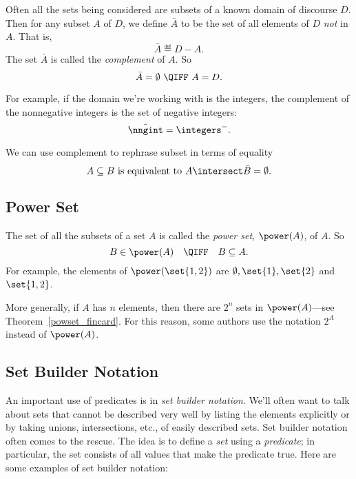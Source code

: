 Often all the sets being considered are subsets of a known domain
of discourse $D$.  Then for any subset $A$ of $D$, we define
$\bar{A}$ to be the set of all elements of $D$ \textit{not} in $A$.
That is,
\[
\bar{A} \eqdef D-A.
\]
The set $\bar{A}$ is called the \emph{complement}
  of $A$.  So
\[
\bar{A} = \emptyset\ \QIFF\ A = D.
\]

For example, if the domain we're working with is the integers, the
complement of the nonnegative integers is the set of negative integers:
\[
\bar{\nngint} = \integers^-.
\]

We can use complement to rephrase subset in terms of equality
\[
A \subseteq B \text{  is equivalent to  } A \intersect \bar{B} = \emptyset.
\]

\iffalse
It can be helpful to rephrase properties of sets using complements.  For
example, two sets $A$ and $B$ are said to be \term{disjoint} iff they
have no elements in common, that is, $A \intersect B = \emptyset$.  This
is the same as saying that $A$ is a subset of the complement of $B$, that
is, $A \subseteq \bar{B}$.
\fi

\subsection{Power Set}

The set of all the subsets of a set $A$ is called the \emph{power
  set},%
$\power(A)$, of $A$.  So
\[
B \in \power(A)\quad  \QIFF\quad  B \subseteq A.
\]
For example, the elements of $\power(\set{1, 2})$ are $\emptyset,
\set{1}, \set{2}$ and $\set{1, 2}$.

More generally, if $A$ has $n$ elements, then there are $2^n$ sets in
$\power(A)$---see Theorem~\ref{powset_fincard}.  For this reason,
some authors use the notation $2^A$ instead of $\power(A)$.

\subsection{Set Builder Notation}\label{set_builder_sec}

An important use of predicates is in%
\emph{set builder notation}.  We'll
often want to talk about sets that cannot be described very well by
listing the elements explicitly or by taking unions, intersections,
etc., of easily described sets.  Set builder notation often comes to the
rescue.  The idea is to define a \emph{set} using a \emph{predicate};
in particular, the set consists of all values that make the predicate
true.  Here are some examples of set builder notation:

